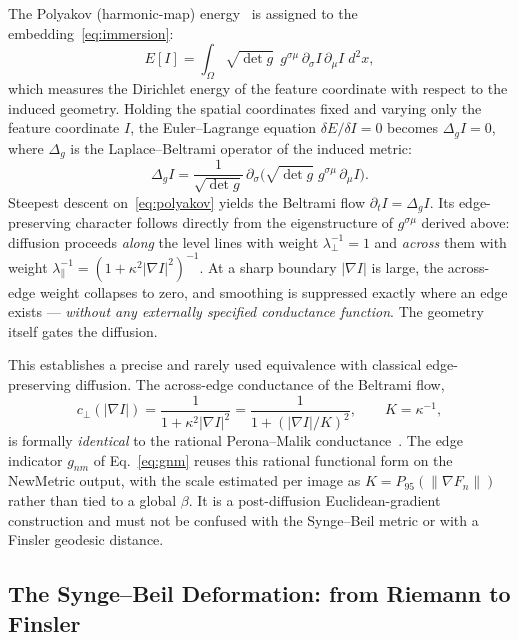 \documentclass[11pt,a4paper]{article}
\begin{document}
The Polyakov (harmonic-map) energy~\cite{polyakov1981} is assigned to the
embedding~\eqref{eq:immersion}:
\begin{equation}
E[I]=\int_\Omega \sqrt{\det g}\;\, g^{\sigma\mu}\,\partial_\sigma I\,\partial_\mu I \; d^2x,
\label{eq:polyakov}
\end{equation}
which measures the Dirichlet energy of the feature coordinate with respect to the
induced geometry. Holding the spatial coordinates fixed and varying only the
feature coordinate $I$, the Euler--Lagrange equation $\delta E/\delta I=0$ becomes
$\Delta_g I=0$, where $\Delta_g$ is the Laplace--Beltrami operator of the induced
metric:
\begin{equation}
\Delta_g I=\frac{1}{\sqrt{\det g}}\,\partial_\sigma\!\Big(\sqrt{\det g}\; g^{\sigma\mu}\,\partial_\mu I\Big).
\label{eq:lb}
\end{equation}
Steepest descent on~\eqref{eq:polyakov} yields the Beltrami flow
$\partial_t I=\Delta_g I$. Its edge-preserving character follows directly from the
eigenstructure of $g^{\sigma\mu}$ derived above: diffusion proceeds \emph{along}
the level lines with weight $\lambda_\perp^{-1}=1$ and \emph{across} them with
weight $\lambda_\parallel^{-1}=(1+\kappa^2|\nabla I|^2)^{-1}$. At a sharp boundary
$|\nabla I|$ is large, the across-edge weight collapses to zero, and smoothing is
suppressed exactly where an edge exists --- \emph{without any externally specified
conductance function}. The geometry itself gates the diffusion.

This establishes a precise and rarely used equivalence with classical
edge-preserving diffusion. The across-edge conductance of the Beltrami flow,
\begin{equation}
c_\perp(|\nabla I|)=\frac{1}{1+\kappa^2|\nabla I|^2}=\frac{1}{1+(|\nabla I|/K)^2},\qquad K=\kappa^{-1},
\label{eq:pm-equivalence}
\end{equation}
is formally \emph{identical} to the rational Perona--Malik
conductance~\cite{peronamalik1990}. The edge indicator $g_{nm}$ of
Eq.~\eqref{eq:gnm} reuses this rational functional form on the NewMetric output,
with the scale estimated per image as
$K=P_{95}(\lVert\nabla F_n\rVert)$ rather than tied to a global $\beta$. It is a
post-diffusion Euclidean-gradient construction and must not be confused with the
Synge--Beil metric or with a Finsler geodesic distance.

\subsection{The Synge--Beil Deformation: from Riemann to Finsler}\label{sec:theory-finsler}
\end{document}
